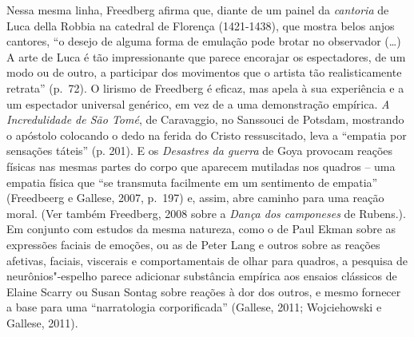 Nessa mesma linha, Freedberg afirma que, diante de um painel da
\emph{cantoria} de Luca della Robbia na catedral de Florença
(1421-1438), que mostra belos anjos cantores, ``o desejo de alguma forma
de emulação pode brotar no observador (\ldots{}) A arte de Luca é tão
impressionante que parece encorajar os espectadores, de um modo ou de
outro, a participar dos movimentos que o artista tão realisticamente
retrata'' (p.~72). O lirismo de Freedberg é eficaz, mas apela à sua
experiência e a um espectador universal genérico, em vez de a uma
demonstração empírica. \emph{A Incredulidade de São Tomé}, de
Caravaggio, no Sanssouci de Potsdam, mostrando o apóstolo colocando o
dedo na ferida do Cristo ressuscitado, leva a ``empatia por sensações
táteis'' (p. 201). E os \emph{Desastres da guerra} de Goya provocam
reações físicas nas mesmas partes do corpo que aparecem mutiladas nos
quadros -- uma empatia física que ``se transmuta facilmente em um
sentimento de empatia'' (Freedbeerg e Gallese, 2007, p.~197) e, assim,
abre caminho para uma reação moral. (Ver também Freedberg, 2008 sobre a
\emph{Dança dos camponeses} de Rubens.). Em conjunto com estudos da
mesma natureza, como o de Paul Ekman sobre as expressões faciais de
emoções, ou as de Peter Lang e outros sobre as reações afetivas,
faciais, viscerais e comportamentais de olhar para quadros, a pesquisa
de neurônios"-espelho parece adicionar substância empírica aos ensaios
clássicos de Elaine Scarry ou Susan Sontag sobre reações à dor dos
outros, e mesmo fornecer a base para uma ``narratologia corporificada''
(Gallese, 2011; Wojciehowski e Gallese, 2011).


